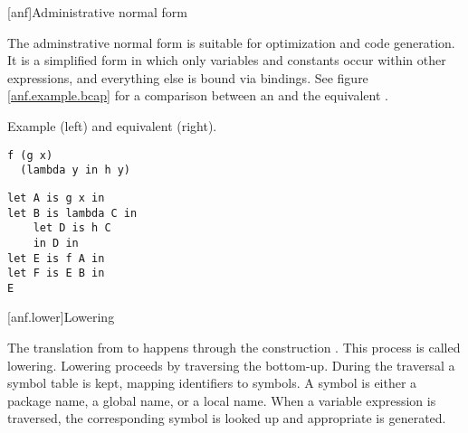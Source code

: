 [anf]{Administrative normal form}

The adminstrative normal form
is suitable for optimization
and code generation.
It is a simplified form
in which only variables
and constants
occur within other expressions,
and everything else
is bound via bindings.
See figure \ref{anf.example.bcap}
for a comparison
between an 
and the equivalent .

\begin{zfigure}[sidebyside]{
    Example  (left)
    and equivalent  (right).
}
    \label{anf.example.bcap}

    \begin{lstlisting}[language=Bottomcap]
f (g x)
  (lambda y in h y)
    \end{lstlisting}

    \tcblower

    \begin{lstlisting}[language=Bottomcap, mathescape=true]
let A is g x in
let B is lambda C in
    let D is h C
    in D in
let E is f A in
let F is E B in
E
    \end{lstlisting}
\end{zfigure}

[anf.lower]{Lowering}

The translation
from 
to 
happens through
the  construction .
This process is called lowering.
Lowering proceeds
by traversing the 
bottom-up.
During the traversal
a symbol table is kept,
mapping identifiers to symbols.
A symbol is either
a package name,
a global name,
or a local name.
When a variable expression is traversed,
the corresponding symbol is looked up
and appropriate  is generated.
